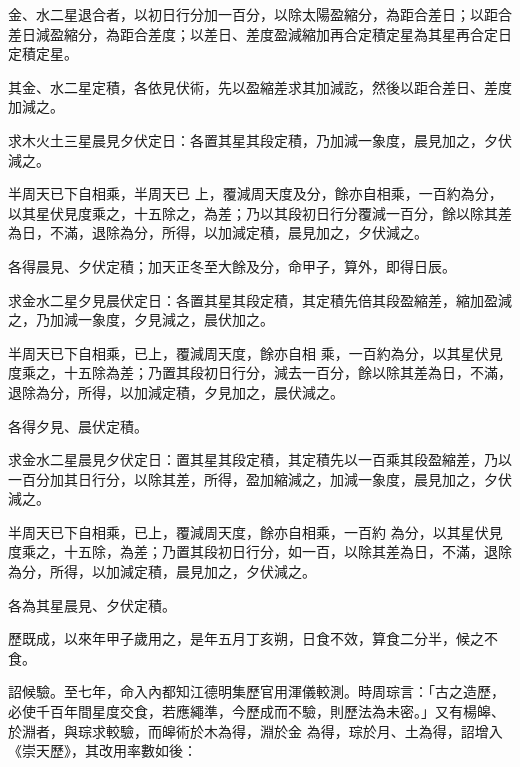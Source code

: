 \begin{pinyinscope}
 金、水二星退合者，以初日行分加一百分，以除太陽盈縮分，為距合差日；以距合差日減盈縮分，為距合差度；以差日、差度盈減縮加再合定積定星為其星再合定日定積定星。



 其金、水二星定積，各依見伏術，先以盈縮差求其加減訖，然後以距合差日、差度加減之。



 求木火土三星晨見夕伏定日：各置其星其段定積，乃加減一象度，晨見加之，夕伏減之。



 半周天已下自相乘，半周天已
 上，覆減周天度及分，餘亦自相乘，一百約為分，以其星伏見度乘之，十五除之，為差；乃以其段初日行分覆減一百分，餘以除其差為日，不滿，退除為分，所得，以加減定積，晨見加之，夕伏減之。



 各得晨見、夕伏定積；加天正冬至大餘及分，命甲子，算外，即得日辰。



 求金水二星夕見晨伏定日：各置其星其段定積，其定積先倍其段盈縮差，縮加盈減之，乃加減一象度，夕見減之，晨伏加之。



 半周天已下自相乘，已上，覆減周天度，餘亦自相
 乘，一百約為分，以其星伏見度乘之，十五除為差；乃置其段初日行分，減去一百分，餘以除其差為日，不滿，退除為分，所得，以加減定積，夕見加之，晨伏減之。



 各得夕見、晨伏定積。



 求金水二星晨見夕伏定日：置其星其段定積，其定積先以一百乘其段盈縮差，乃以一百分加其日行分，以除其差，所得，盈加縮減之，加減一象度，晨見加之，夕伏減之。



 半周天已下自相乘，已上，覆減周天度，餘亦自相乘，一百約
 為分，以其星伏見度乘之，十五除，為差；乃置其段初日行分，如一百，以除其差為日，不滿，退除為分，所得，以加減定積，晨見加之，夕伏減之。



 各為其星晨見、夕伏定積。



 歷既成，以來年甲子歲用之，是年五月丁亥朔，日食不效，算食二分半，候之不食。



 詔候驗。至七年，命入內都知江德明集歷官用渾儀較測。時周琮言：「古之造歷，必使千百年間星度交食，若應繩準，今歷成而不驗，則歷法為未密。」又有楊皞、於淵者，與琮求較驗，而皞術於木為得，淵於金
 為得，琮於月、土為得，詔增入《崇天歷》，其改用率數如後：




\end{pinyinscope}
